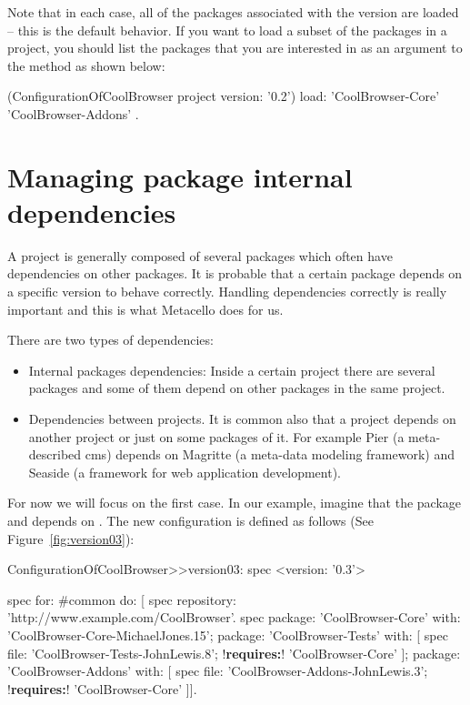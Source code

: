 \documentclass[a4paper,10pt,twoside]{book}
\begin{document}
Note that in each case, all of the packages associated with the version are loaded \--- this  
is the default behavior. If you want to load a subset of the packages in a project, you should list 
the packages that you are interested in as an argument to the  method as shown below:

\begin{code}{}
  (ConfigurationOfCoolBrowser project version: '0.2') load: { 'CoolBrowser-Core' 'CoolBrowser-Addons' }.
\end{code}


\section{Managing package internal dependencies}

A project is generally composed of several packages which often have dependencies on other packages.  It is probable that a certain package depends on a specific version to behave correctly. Handling dependencies correctly is really important and this is what Metacello does for us. 

There are two types of dependencies:
\begin{itemize}
\item Internal packages dependencies: Inside a certain project there are several packages and some of them depend on other packages in the same project. 
\item Dependencies between projects. It is common also that a project depends on another project or just on some packages of it. For example Pier (a meta-described cms) depends on Magritte (a meta-data modeling framework) and Seaside (a framework for web application development).
\end{itemize}

For now we will focus on the first case. In our example, imagine that the package  and  depends on . The new configuration  is defined as follows (See Figure~\ref{fig:version03}):

\begin{code}{}
ConfigurationOfCoolBrowser>>version03: spec 
	<version: '0.3'>
	
	spec for: #common do: [
		spec repository: 'http://www.example.com/CoolBrowser'.
		spec 
			package: 'CoolBrowser-Core' with: 'CoolBrowser-Core-MichaelJones.15';
			package: 'CoolBrowser-Tests' with: [
				spec 
					file: 'CoolBrowser-Tests-JohnLewis.8';
					!\textbf{requires:}! 'CoolBrowser-Core' ];
			package: 'CoolBrowser-Addons' with: [
				spec 
					file: 'CoolBrowser-Addons-JohnLewis.3';
					!\textbf{requires:}! 'CoolBrowser-Core' ]].
\end{code}
\end{document}
